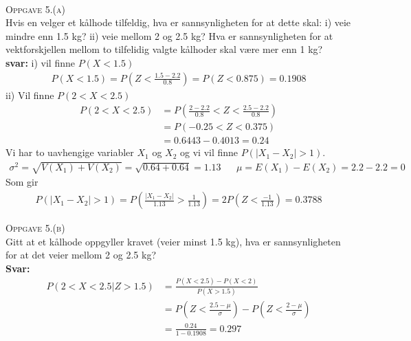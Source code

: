 \documentclass{article}
\begin{document}
\\
\textsc{Oppgave 5.(a)}\\
Hvis en velger et kålhode tilfeldig, hva er sannsynligheten for at dette skal:
i) veie mindre enn 1.5 kg? ii) veie mellom 2 og 2.5 kg? Hva er sannsynligheten
for at vektforskjellen mellom to tilfelidig valgte kålhoder skal være mer enn 1
kg?\\
\textbf{svar:} i) vil finne $P(X<1.5)$
\begin{align*}
  P(X<1.5)=P\left(Z<\frac{1.5-2.2}{0.8}\right)=P(Z<0.875)=0.1908
\end{align*}
ii) Vil finne $P(2<X<2.5)$
\begin{align*}
  P(2<X<2.5) &= P\left(\frac{2-2.2}{0.8}<Z< \frac{2.5-2.2}{0.8} \right)\\
             &=P(-0.25 < Z < 0.375)\\
             &= 0.6443-0.4013=0.24
\end{align*}
Vi har to uavhengige variabler $X_1$ og $X_2$ og vi vil finne $P(|X_1-X_2|>1)$.
\begin{align*}
  \sigma^2= \sqrt{V(X_1) + V(X_2)}=\sqrt{0.64+0.64}=1.13 && \mu=E(X_1) - E(X_2)=2.2-2.2=0
\end{align*}
Som gir
\begin{align*}
  P(|X_1-X_2|>1)=P\left( \frac{|X_1-X_2|}{1.13}> \frac{1}{1.13} \right)= 2P\left( Z< \frac{-1}{1.13} \right)=0.3788
\end{align*}

\textsc{Oppgave 5.(b)}\\
Gitt at et kålhode oppgyller kravet (veier minst 1.5 kg), hva er sannsynligheten
for at det veier mellom 2 og 2.5 kg?\\
\textbf{Svar:}
\begin{align*}
  P(2<X<2.5 | Z > 1.5) &= \frac{P(X<2.5)-P(X<2)}{P(X>1.5)}\\
                       &= P\left( Z < \frac{2.5-\mu}{\sigma} \right)-P\left(Z < \frac{2-\mu}{\sigma} \right)\\
                       &= \frac{0.24}{1-0.1908}=0.297
\end{align*}
\end{document}
